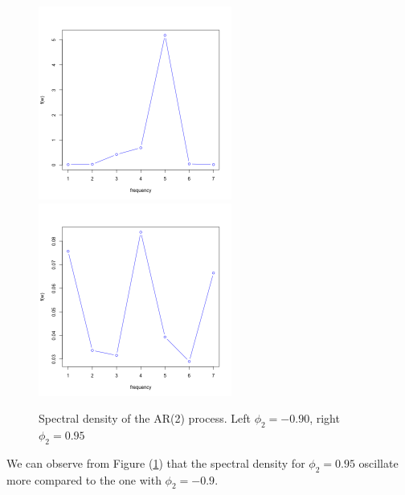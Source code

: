 \documentclass[11pt, oneside]{article}   	%
\begin{document}
\begin{figure}[H] %
   \centering
    \includegraphics[width=2.5in]{../code/theoreticalDensity.png}
   \includegraphics[width=2.5in]{../code/theoreticalDensity2.png} 
   \caption{Spectral density of the AR(2) process. Left $\phi_{2} = -0.90$, right $\phi_{2} = 0.95$ }
   \label{fig:sd2}
\end{figure}

We can observe from Figure (\ref{fig:sd2}) that the spectral density for $\phi_{2} = 0.95$ oscillate more compared to the one with $\phi_{2} = -0.9$.
%
\end{document}
